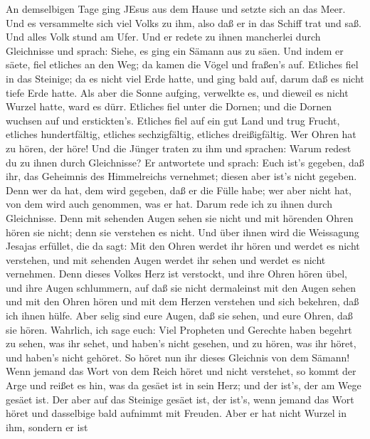  An demselbigen Tage ging JEsus aus dem Hause und setzte
sich an das Meer.  Und es versammelte sich viel Volks zu
ihm, also daß er in das Schiff trat und saß. Und alles Volk stund am
Ufer.  Und er redete zu ihnen mancherlei durch Gleichnisse
und sprach: Siehe, es ging ein Sämann aus zu säen.  Und
indem er säete, fiel etliches an den Weg; da kamen die Vögel und
fraßen's auf.  Etliches fiel in das Steinige; da es nicht
viel Erde hatte, und ging bald auf, darum daß es nicht tiefe Erde hatte.
 Als aber die Sonne aufging, verwelkte es, und dieweil es
nicht Wurzel hatte, ward es dürr.  Etliches fiel unter die
Dornen; und die Dornen wuchsen auf und erstickten's. 
Etliches fiel auf ein gut Land und trug Frucht, etliches hundertfältig,
etliches sechzigfältig, etliches dreißigfältig.  Wer Ohren
hat zu hören, der höre!  Und die Jünger traten zu ihm und
sprachen: Warum redest du zu ihnen durch Gleichnisse?  Er
antwortete und sprach: Euch ist's gegeben, daß ihr, das Geheimnis des
Himmelreichs vernehmet; diesen aber ist's nicht gegeben. 
Denn wer da hat, dem wird gegeben, daß er die Fülle habe; wer aber nicht
hat, von dem wird auch genommen, was er hat.  Darum rede
ich zu ihnen durch Gleichnisse. Denn mit sehenden Augen sehen sie nicht
und mit hörenden Ohren hören sie nicht; denn sie verstehen es nicht.
 Und über ihnen wird die Weissagung Jesajas erfüllet, die
da sagt: Mit den Ohren werdet ihr hören und werdet es nicht verstehen,
und mit sehenden Augen werdet ihr sehen und werdet es nicht vernehmen.
 Denn dieses Volkes Herz ist verstockt, und ihre Ohren
hören übel, und ihre Augen schlummern, auf daß sie nicht dermaleinst mit
den Augen sehen und mit den Ohren hören und mit dem Herzen verstehen und
sich bekehren, daß ich ihnen hülfe.  Aber selig sind eure
Augen, daß sie sehen, und eure Ohren, daß sie hören. 
Wahrlich, ich sage euch: Viel Propheten und Gerechte haben begehrt zu
sehen, was ihr sehet, und haben's nicht gesehen, und zu hören, was ihr
höret, und haben's nicht gehöret.  So höret nun ihr dieses
Gleichnis von dem Sämann!  Wenn jemand das Wort von dem
Reich höret und nicht verstehet, so kommt der Arge und reißet es hin,
was da gesäet ist in sein Herz; und der ist's, der am Wege gesäet ist.
 Der aber auf das Steinige gesäet ist, der ist's, wenn
jemand das Wort höret und dasselbige bald aufnimmt mit Freuden.
 Aber er hat nicht Wurzel in ihm, sondern er ist
